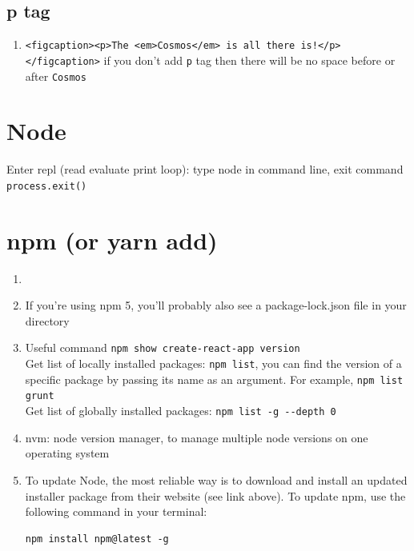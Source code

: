 \documentclass[a4paper, 12pt]{article}
\begin{document}
\subsection{p tag}
\begin{enumerate}
\item \verb|<figcaption><p>The <em>Cosmos</em> is all there is!</p></figcaption>| if you don't add \verb|p| tag then there will be no space before or after \verb|Cosmos|
\end{enumerate}


\section{Node}
Enter repl (read evaluate print loop): type node in command line, exit command \verb|process.exit()|



\section{npm (or yarn add)}
\begin{enumerate}

\item 

\item If you're using npm 5, you'll probably also see a package-lock.json file in your directory

\item Useful command \verb|npm show create-react-app version|\\
Get list of locally installed packages: \verb|npm list|, you can find the version of a specific package by passing its name as an argument. For example, \verb|npm list grunt|\\
Get list of globally installed packages: \verb|npm list -g --depth 0|

\item nvm: node version manager, to manage multiple node versions on one operating system

\item To update Node, the most reliable way is to download and install an updated installer package from their website (see link above). To update npm, use the following command in your terminal:
\begin{verbatim}
npm install npm@latest -g
\end{verbatim}
\end{enumerate}
\end{document}
